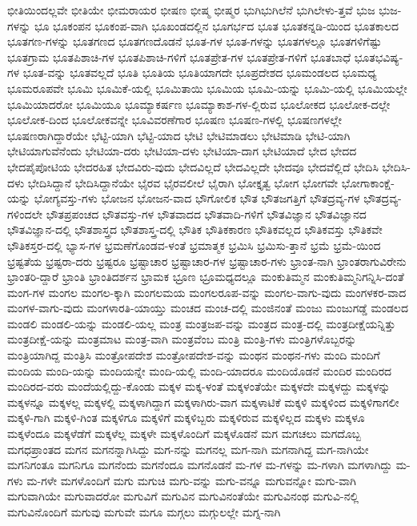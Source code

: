 {ಭೀತಿಯಿಂದಲ್ಲವೇ
ಭೀತಿಯೇ
ಭೀಮರಾಯರ
ಭೀಷಣ
ಭೀಷ್ಮ
ಭೀಷ್ಮರ
ಭುಗಿಭುಗಿಲೆನೆ
ಭುಗಿಲೇಳು-ತ್ತವೆ
ಭುಜ
ಭುಜ-ಗಳನ್ನು
ಭೂ
ಭೂಕಂಪನ
ಭೂಕಂಪ-ವಾಗಿ
ಭೂಖಂಡದಲ್ಲಿನ
ಭೂಗರ್ಭದ
ಭೂತ
ಭೂತಕನ್ನಡಿ-ಯಿಂದ
ಭೂತಕಾಲದ
ಭೂತಗಣ-ಗಳನ್ನು
ಭೂತಗಣದ
ಭೂತಗಣದೊಡನೆ
ಭೂತ-ಗಳ
ಭೂತ-ಗಳನ್ನು
ಭೂತಗಳಲ್ಲೂ
ಭೂತಗಳಿಗೆಷ್ಟು
ಭೂತಗ್ರಾಮ
ಭೂತಪಿಶಾಚಿ-ಗಳ
ಭೂತಪಿಶಾಚಿ-ಗಳಿಗೆ
ಭೂತಪ್ರೇತ-ಗಳ
ಭೂತಪ್ರೇತ-ಗಳಿಗೆ
ಭೂತಬಾಧೆ
ಭೂತಭವಿಷ್ಯ-ಗಳ
ಭೂತ-ವನ್ನು
ಭೂತವಲ್ಲದೆ
ಭೂತಿ
ಭೂತಿಯ
ಭೂತಿಯಾಗದೇ
ಭೂಪ್ರದೇಶದ
ಭೂಮಂಡಲದ
ಭೂಮಧ್ಯ
ಭೂಮರೂಪವೇ
ಭೂಮಿ
ಭೂಮಿಕೆ-ಯಲ್ಲಿ
ಭೂಮಿತಾಯಿ
ಭೂಮಿಯ
ಭೂಮಿ-ಯನ್ನು
ಭೂಮಿ-ಯಲ್ಲಿ
ಭೂಮಿಯಲ್ಲೇ
ಭೂಮಿಯಾದರೋ
ಭೂಮಿಯೂ
ಭೂಮ್ಯಾಕರ್ಷಣ
ಭೂಮ್ಯಾಕಾಶ-ಗಳ-ಲ್ಲಿರುವ
ಭೂಲೋಕದ
ಭೂಲೋಕ-ದಲ್ಲೇ
ಭೂಲೋಕ-ದಿಂದ
ಭೂಲೋಕವನ್ನೇ
ಭೂವಿವರಣೆಗಾರ
ಭೂಷಣ
ಭೂಷಣ-ಗಳಲ್ಲಿ
ಭೂಷಣಗಳಲ್ಲೇ
ಭೂಷಣರಾಗಿದ್ದಾರೆಯೇ
ಭೆಟ್ಟಿ-ಯಾಗಿ
ಭೆಟ್ಟಿ-ಯಾದ
ಭೇಟಿ
ಭೇಟಿಮಾಡಲು
ಭೇಟಿಮಾಡಿ
ಭೇಟಿ-ಯಾಗಿ
ಭೇಟಿಯಾಗುವೆನೆಂದು
ಭೇಟಿಯಾ-ದರು
ಭೇಟಿಯಾ-ದಳು
ಭೇಟಿಯಾ-ದಾಗ
ಭೇಟಿಯಾದೆ
ಭೇದ
ಭೇದದ
ಭೇದಪೈಪೋಟಿಯ
ಭೇದರಹಿತ
ಭೇದವಿರು-ವುದು
ಭೇದವಿಲ್ಲದೆ
ಭೇದವಿಲ್ಲದೇ
ಭೇದವೂ
ಭೇದವೆಲ್ಲಿದೆ
ಭೇದಿಸಿ
ಭೇದಿಸಿ-ದಳು
ಭೇದಿಸಿದ್ದಾನೆ
ಭೇದಿಸಿದ್ದಾನೆಯೇ
ಭೈರವ
ಭೈರವಲೀಲೆ
ಭೈರಾಗಿ
ಭೋಕ್ತೃತ್ವ
ಭೋಗ
ಭೋಗವೇ
ಭೋಗಾಕಾಂಕ್ಷೆ-ಯನ್ನು
ಭೋಗ್ಯವಸ್ತು-ಗಳು
ಭೋಜನ
ಭೋಜನ-ವಾದ
ಭೌಗೋಲಿಕ
ಭೌತ
ಭೌತಜಗತ್ತಿಗೆ
ಭೌತದ್ರವ್ಯ-ಗಳ
ಭೌತದ್ರವ್ಯ-ಗಳಿಂದಲೇ
ಭೌತಪ್ರಪಂಚದ
ಭೌತವಸ್ತು-ಗಳ
ಭೌತವಾದದ
ಭೌತವಾದಿ-ಗಳಿಗೆ
ಭೌತವಿಜ್ಞಾನ
ಭೌತವಿಜ್ಞಾನದ
ಭೌತವಿಜ್ಞಾನ-ದಲ್ಲಿ
ಭೌತಶಾಸ್ತ್ರದ
ಭೌತಶಾಸ್ತ್ರ-ದಲ್ಲಿ
ಭೌತಿಕ
ಭೌತಿಕಕಾರಣ
ಭೌತಿಕವಲ್ಲದ
ಭೌತಿಕವಸ್ತು
ಭೌತಿಕವೇ
ಭೌತಿಕಸ್ತರ-ದಲ್ಲಿ
ಭ್ಯಾಸ-ಗಳ
ಭ್ರಮಣೆಗೊಂಡವ-ಳಂತೆ
ಭ್ರಮಾತ್ಮಕ
ಭ್ರಮಿಸಿ
ಭ್ರಮಿಸು-ತ್ತಾನೆ
ಭ್ರಮೆ
ಭ್ರಮೆ-ಯಿಂದ
ಭ್ರಷ್ಟತೆಯ
ಭ್ರಷ್ಟರಾ-ದರು
ಭ್ರಷ್ಟರೂ
ಭ್ರಷ್ಟಾಚಾರ
ಭ್ರಷ್ಟಾಚಾರ-ಗಳ
ಭ್ರಷ್ಟಾಚಾರ-ಗಳು
ಭ್ರಾಂತ-ನಾಗಿ
ಭ್ರಾಂತರಾಗುವಿರೇನು
ಭ್ರಾಂತರಿ-ದ್ದಾರೆ
ಭ್ರಾಂತಿ
ಭ್ರಾಂತಿದರ್ಶನ
ಭ್ರಾಮಕ
ಭ್ರೂಣ
ಭ್ರೂಮಧ್ಯದಲ್ಲೂ
ಮಂಕುತಿಮ್ಮನ
ಮಂಕುತಿಮ್ಮನಿಗನ್ನಿಸಿ-ದಂತೆ
ಮಂಗ-ಗಳ
ಮಂಗಲ
ಮಂಗಲ-ಕ್ಕಾಗಿ
ಮಂಗಲಮಯ
ಮಂಗಲರೂಪ-ವನ್ನು
ಮಂಗಲ-ವಾಗು-ವುದು
ಮಂಗಳಕರ-ವಾದ
ಮಂಗಳ-ವಾಗು-ವುದು
ಮಂಗಳಾರತಿ-ಯಾಯ್ತು
ಮಂಚದ
ಮಂಚ-ದಲ್ಲಿ
ಮಂಜಿನಂತೆ
ಮಂಜು
ಮಂಜುಗಡ್ಡೆ
ಮಂಡಲದ
ಮಂಡಲಿ
ಮಂಡಲಿ-ಯನ್ನು
ಮಂಡಲಿ-ಯಲ್ಲ
ಮಂತ್ರ
ಮಂತ್ರಜಪ-ವನ್ನು
ಮಂತ್ರದ
ಮಂತ್ರ-ದಲ್ಲಿ
ಮಂತ್ರದೀಕ್ಷೆಯನ್ನಿತ್ತು
ಮಂತ್ರದೀಕ್ಷೆ-ಯನ್ನು
ಮಂತ್ರಮಾಟ
ಮಂತ್ರ-ವಾಗಿ
ಮಂತ್ರವೆಂಬ
ಮಂತ್ರಿ
ಮಂತ್ರಿ-ಗಳು
ಮಂತ್ರಿಗಳೊಬ್ಬರನ್ನು
ಮಂತ್ರಿಯಾಗಿದ್ದ
ಮಂತ್ರಿಸಿ
ಮಂತ್ರೋಪದೇಶ
ಮಂತ್ರೋಪದೇಶ-ವನ್ನು
ಮಂಥನ
ಮಂಥನ-ಗಳು
ಮಂದಿ
ಮಂದಿಗೆ
ಮಂದಿಯ
ಮಂದಿ-ಯನ್ನು
ಮಂದಿಯನ್ನೇ
ಮಂದಿ-ಯಲ್ಲಿ
ಮಂದಿ-ಯಾದರೂ
ಮಂದಿಯೊಡನೆ
ಮಂದಿರ
ಮಂದಿರದ
ಮಂದಿರದ-ವರು
ಮಂದೆಯಲ್ಲಿದ್ದು-ಕೊಂಡು
ಮಕ್ಕಳ
ಮಕ್ಕ-ಳಂತೆ
ಮಕ್ಕಳಂತೆಯೇ
ಮಕ್ಕಳದೇ
ಮಕ್ಕಳದ್ದು
ಮಕ್ಕಳನ್ನು
ಮಕ್ಕಳನ್ನೂ
ಮಕ್ಕಳಲ್ಲ
ಮಕ್ಕಳಲ್ಲಿ
ಮಕ್ಕಳಾಗಿದ್ದಾಗ
ಮಕ್ಕಳಾಗಿರು-ವಾಗ
ಮಕ್ಕಳಾಟಿಕೆ
ಮಕ್ಕಳಿ
ಮಕ್ಕಳಿಂದ
ಮಕ್ಕಳಿಗಾಗಲೀ
ಮಕ್ಕಳಿ-ಗಾಗಿ
ಮಕ್ಕಳಿ-ಗಿಂತ
ಮಕ್ಕಳಿಗೂ
ಮಕ್ಕಳಿಗೆ
ಮಕ್ಕಳಿಬ್ಬರು
ಮಕ್ಕಳಿರುವ
ಮಕ್ಕಳಿಲ್ಲದ
ಮಕ್ಕಳು
ಮಕ್ಕಳೂ
ಮಕ್ಕಳೆಂದೂ
ಮಕ್ಕಳೆಡೆಗೆ
ಮಕ್ಕಳೆಲ್ಲ
ಮಕ್ಕಳೇ
ಮಕ್ಕಳೊಂದಿಗೆ
ಮಕ್ಕಳೊಡನೆ
ಮಗ
ಮಗಚಲು
ಮಗದೊಬ್ಬ
ಮಗಧಪ್ರಾಂತದ
ಮಗನ
ಮಗನನ್ನಾಗಿಸಿದ್ದು
ಮಗ-ನನ್ನು
ಮಗನಲ್ಲ
ಮಗ-ನಾಗಿ
ಮಗನಾಗಿದ್ದ
ಮಗ-ನಾಗಿಯೇ
ಮಗನಿಗಂತೂ
ಮಗನಿಗೂ
ಮಗನೆಂದು
ಮಗನೆಂದೂ
ಮಗನೊಡನೆ
ಮ-ಗಳ
ಮ-ಗಳನ್ನು
ಮ-ಗಳಾಗಿ
ಮಗಳಾಗಿದ್ದು
ಮ-ಗಳು
ಮ-ಗಳೇ
ಮಗಳೊಂದಿಗೆ
ಮಗು
ಮಗುಚಿ
ಮಗು-ವನ್ನು
ಮಗು-ವನ್ನೂ
ಮಗುವನ್ನೋ
ಮಗು-ವಾಗಿ
ಮಗುವಾಗಿಯೇ
ಮಗುವಾದರೋ
ಮಗುವಿಗೆ
ಮಗುವಿನ
ಮಗುವಿನಂತೆಯೇ
ಮಗುವಿನಂಥ
ಮಗುವಿ-ನಲ್ಲಿ
ಮಗುವಿನೊಂದಿಗೆ
ಮಗುವು
ಮಗುವೇ
ಮಗೂ
ಮಗ್ಗಲು
ಮಗ್ಗುಲಲ್ಲೇ
ಮಗ್ನ-ನಾಗಿ
}
